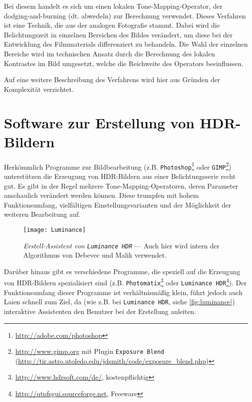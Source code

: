Bei diesem handelt es sich um einen lokalen \gls{Tone-Mapping}-Operator, der dodging-and-burning (dt. abwedeln) zur Berechnung verwendet. Dieses Verfahren ist eine Technik, die aus der analogen Fotografie stammt. Dabei wird die Belichtungszeit in einzelnen Bereichen des Bildes verändert, um diese bei der Entwicklung des Filmmaterials differenziert zu behandeln. Die Wahl der einzelnen Bereiche wird im technischen Ansatz durch die Berechnung des lokalen Kontrastes im Bild umgesetzt, welche die Reichweite des Operators beeinflussen.

Auf eine weitere Beschreibung des Verfahrens wird hier aus Gründen der Komplexität verzichtet.


\section{Software zur Erstellung von HDR-Bildern}
\label{sec:software}
Herkömmlich Programme zur Bildbearbeitung (z.B. \texttt{Photoshop}\footnote{\url{http://adobe.com/photoshop}} oder \texttt{GIMP}\footnote{\url{http://www.gimp.org} mit Plugin \texttt{Exposure Blend} (\url{http://tir.astro.utoledo.edu/jdsmith/code/exposure_blend.php})}) unterstützen die Erzeugung von \gls{HDR}-Bildern aus einer Belichtungsserie recht gut. Es gibt in der Regel mehrere \gls{Tone-Mapping}-Operatoren, deren Parameter anschaulich verändert werden können. Diese trumpfen mit hohem Funktionsumfang, vielfältigen Einstellungsvarianten und der Möglichkeit der weiteren Bearbeitung auf.


\begin{figure}[h]
  \begin{center}
    \texttt{[image: Luminance]}
    \caption{\textit{Erstell-Assistent von \texttt{Luminance HDR}} --- Auch hier wird intern der Algorithmus von Debevec und Malik verwendet.}
    \label{fig:luminance}
  \end{center}
\end{figure}

Darüber hinaus gibt es verschiedene Programme, die speziell auf die Erzeugung von \gls{HDR}-Bildern spezialisiert sind (z.B. \texttt{Photomatix}\footnote{\url{http://www.hdrsoft.com/de/}, kostenpflichtig} oder \texttt{Luminance HDR}\footnote{\url{http://qtpfsgui.sourceforge.net}, Freeware}). Der Funktionsumfang dieser Programme ist verhältnismäßig klein, führt jedoch auch Laien schnell zum Ziel, da (wie z.B. bei \texttt{Luminance HDR}, siehe \autoref{fig:luminance}) interaktive Assistenten den Benutzer bei der Erstellung anleiten. 


